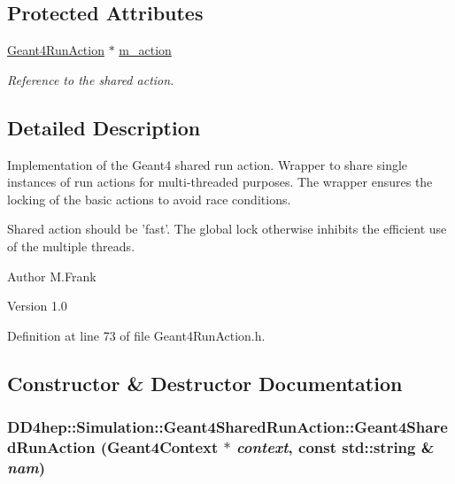 \subsection*{Protected Attributes}
\begin{DoxyCompactItemize}
\item 
\hyperlink{class_d_d4hep_1_1_simulation_1_1_geant4_run_action}{Geant4RunAction} $\ast$ \hyperlink{class_d_d4hep_1_1_simulation_1_1_geant4_shared_run_action_a2d197cf997162e46c7dc5aa51c46a6c7}{m\_\-action}
\begin{DoxyCompactList}\small\item\em Reference to the shared action. \item\end{DoxyCompactList}\end{DoxyCompactItemize}


\subsection{Detailed Description}
Implementation of the Geant4 shared run action. Wrapper to share single instances of run actions for multi-\/threaded purposes. The wrapper ensures the locking of the basic actions to avoid race conditions.

Shared action should be 'fast'. The global lock otherwise inhibits the efficient use of the multiple threads.

\begin{DoxyAuthor}{Author}
M.Frank 
\end{DoxyAuthor}
\begin{DoxyVersion}{Version}
1.0 
\end{DoxyVersion}


Definition at line 73 of file Geant4RunAction.h.

\subsection{Constructor \& Destructor Documentation}
\hypertarget{class_d_d4hep_1_1_simulation_1_1_geant4_shared_run_action_aeb1d4859106fe1d968a4433b2630561a}{
\subsubsection[{Geant4SharedRunAction}]{\setlength{\rightskip}{0pt plus 5cm}DD4hep::Simulation::Geant4SharedRunAction::Geant4SharedRunAction ({\bf Geant4Context} $\ast$ {\em context}, \/  const std::string \& {\em nam})}}
\label{class_d_d4hep_1_1_simulation_1_1_geant4_shared_run_action_aeb1d4859106fe1d968a4433b2630561a}


